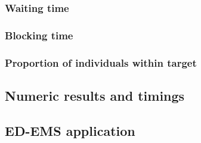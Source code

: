 \subsubsection{Waiting time}

\subsubsection{Blocking time}

\subsubsection{Proportion of individuals within target}


\subsection{Numeric results and timings}


\subsection{ED-EMS application}
